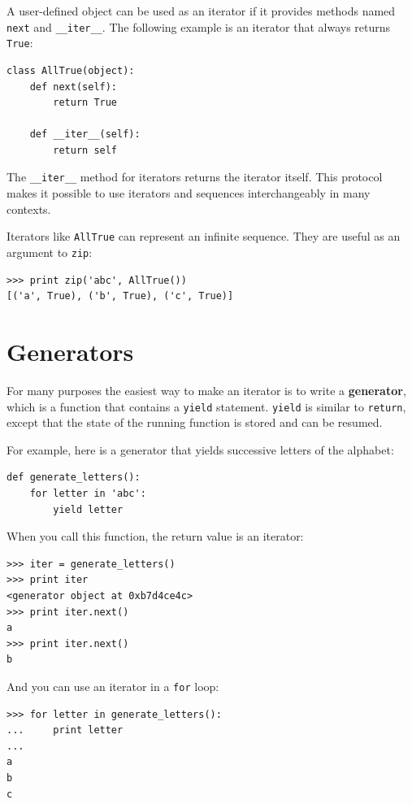 \documentclass[10pt]{book}
\begin{document}
A user-defined object can be used as an iterator if it
provides methods named {\tt next} and \verb"__iter__".
The following example is an iterator that always returns {\tt True}:
%
\begin{verbatim}
class AllTrue(object):
    def next(self):
        return True

    def __iter__(self):
        return self
\end{verbatim}
%
The \verb"__iter__" method for iterators returns the iterator
itself.  This protocol makes it possible to use iterators
and sequences interchangeably in many contexts.

Iterators like {\tt AllTrue} can represent an infinite sequence.
They are useful as an argument to {\tt zip}:
%
\begin{verbatim}
>>> print zip('abc', AllTrue())
[('a', True), ('b', True), ('c', True)]
\end{verbatim}


\section{Generators}

For many purposes the easiest way to make an iterator is to
write a {\bf generator}, which is a function that contains a
{\tt yield} statement.  {\tt yield} is similar to {\tt return},
except that the state of the running function is stored and
can be resumed.

For example, here is a generator that yields successive letters
of the alphabet:

\begin{verbatim}
def generate_letters():
    for letter in 'abc':
        yield letter
\end{verbatim}

When you call this function, the return value is an iterator:

\begin{verbatim}
>>> iter = generate_letters()
>>> print iter
<generator object at 0xb7d4ce4c>
>>> print iter.next()
a
>>> print iter.next()
b
\end{verbatim}

And you can use an iterator in a {\tt for} loop:

\begin{verbatim}
>>> for letter in generate_letters():
...     print letter
...
a
b
c
\end{verbatim}
\end{document}
